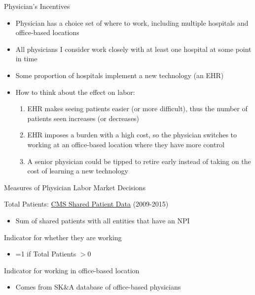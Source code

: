 \documentclass[10pt]{beamer}
\begin{document}
\begin{frame}{Physician's Incentives}
\begin{itemize}
    \item Physician has a choice set of where to work, including multiple hospitals and office-based locations
    \item All physicians I consider work closely with at least one hospital at some point in time
    \item Some proportion of hospitals implement a new technology (an EHR)
    \item How to think about the effect on labor:
    \begin{enumerate}
        \item EHR makes seeing patients easier (or more difficult), thus the number of patients seen increases (or decreases)
        \item EHR imposes a burden with a high cost, so the physician switches to working at an office-based location where they have more control
        \item A senior physician could be tipped to retire early instead of taking on the cost of learning a new technology
    \end{enumerate}
\end{itemize}
\end{frame}


\begin{frame}{Measures of Physician Labor Market Decisions}


     Total Patients: \underline{CMS Shared Patient Data} (2009-2015)
    \begin{itemize}
        \item Sum of shared patients with all entities that have an NPI
    \end{itemize}
    
     Indicator for whether they are working
    \begin{itemize}
        \item =1 if Total Patients $>0$
    \end{itemize}
    
     Indicator for working in office-based location
    \begin{itemize}
        \item Comes from SK$\&$A database of office-based physicians
    \end{itemize}

\end{frame}
\end{document}
